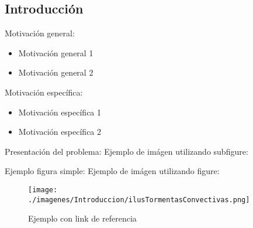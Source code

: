 \documentclass[
  aspectratio=169,
]{beamer}
\begin{document}
\begin{small}
\subsection[Introducción]{Introducción}
\begin{frame}
	\begin{block}{Motivación general:}
		\begin{itemize}
			\item Motivación general 1
			\pause
			\item Motivación general 2
			\pause
		\end{itemize}
	\end{block}
	\vfill
	\begin{block}{Motivación específica:}
		\begin{itemize}
			\item Motivación específica 1
			\pause
			\item Motivación específica 2
		\end{itemize}
	\end{block}
\end{frame}

\begin{frame}{Presentación del problema:}{}
	Ejemplo de imágen utilizando subfigure: 
	\begin{figure}[htbp]
		\centering
		\subfigure[Caption 1 ]{	\def\svgwidth{35mm}
			}
	\end{figure}
\end{frame}

\begin{frame}{Ejemplo figura simple:}{}
	Ejemplo de imágen utilizando figure: 
	\begin{figure}[htbp]
		\centering
		\texttt{[image: ./imagenes/Introduccion/ilusTormentasConvectivas.png]}
		\caption{ Ejemplo con link de referencia \href{https://www.britannica.com/science/thunderstorm}{}}
	\end{figure}
\end{frame}



\end{small}
\end{document}
